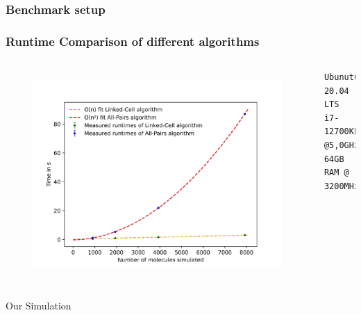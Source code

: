 \begin{frame}
	\frametitle{Benchmark setup}
		
\end{frame}


\begin{frame}[fragile]
	\frametitle{Runtime Comparison of different algorithms}
	\begin{columns}
			\vspace{-0.9cm}
			\begin{figure}
				\centering
				\includegraphics[width=\linewidth]{plot}
				\label{fig:plot}
			\end{figure}
		\begin{lstlisting}
Ubunutu 20.04 LTS
i7-12700KF @5,0GHz
64GB RAM @ 3200MHz
		\end{lstlisting}
	\end{columns}
\end{frame}

\begin{frame}{Our Simulation}
	\begin{figure}[h!]
		\centering    
	\end{figure} 
\end{frame}

